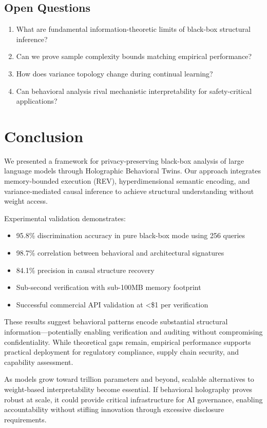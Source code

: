 \documentclass[11pt,a4paper]{article}
\begin{document}
\subsection{Open Questions}

\begin{enumerate}
\item What are fundamental information-theoretic limits of black-box structural inference?
\item Can we prove sample complexity bounds matching empirical performance?
\item How does variance topology change during continual learning?
\item Can behavioral analysis rival mechanistic interpretability for safety-critical applications?
\end{enumerate}

\section{Conclusion}

We presented a framework for privacy-preserving black-box analysis of large language models through Holographic Behavioral Twins. Our approach integrates memory-bounded execution (REV), hyperdimensional semantic encoding, and variance-mediated causal inference to achieve structural understanding without weight access.

Experimental validation demonstrates:
\begin{itemize}
\item 95.8\% discrimination accuracy in pure black-box mode using 256 queries
\item 98.7\% correlation between behavioral and architectural signatures
\item 84.1\% precision in causal structure recovery
\item Sub-second verification with sub-100MB memory footprint
\item Successful commercial API validation at \textless\$1 per verification
\end{itemize}

These results suggest behavioral patterns encode substantial structural information—potentially enabling verification and auditing without compromising confidentiality. While theoretical gaps remain, empirical performance supports practical deployment for regulatory compliance, supply chain security, and capability assessment.

As models grow toward trillion parameters and beyond, scalable alternatives to weight-based interpretability become essential. If behavioral holography proves robust at scale, it could provide critical infrastructure for AI governance, enabling accountability without stifling innovation through excessive disclosure requirements.
\end{document}
